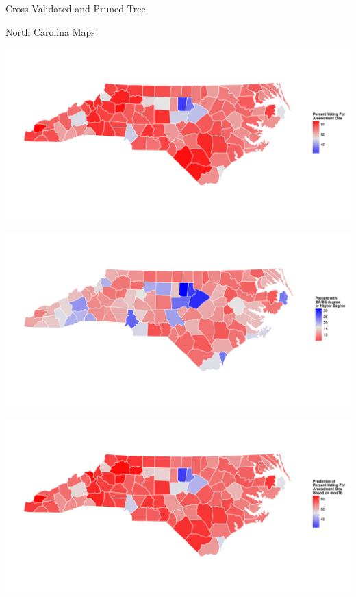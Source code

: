 \documentclass[final]{beamer}\usepackage[]{graphicx}\usepackage[]{color}
\makeatletter
\def\maxwidth{ %
  \ifdim\Gin@nat@width>\linewidth
    \linewidth
  \else
    \Gin@nat@width
  \fi
}
\newenvironment{knitrout}{}{} %
\makeatother
\begin{document}
\begin{frame}[fragile]
\begin{columns}[t]
\begin{column}{0.31\linewidth}
\begin{minipage}[t][.955\textheight]{\linewidth}
\begin{block}{Cross Validated and Pruned Tree}
\begin{knitrout}
{}



\end{knitrout}
\vspace{-3ex}
\end{block}
\vfill

\begin{block}{North Carolina Maps}
\vspace{-2ex}
\begin{knitrout}
\color{fgcolor}

{\centering \includegraphics[width=\maxwidth]{figure/NCmap-1} 

}




{\centering \includegraphics[width=\maxwidth]{figure/NCmap-2} 

}




{\centering \includegraphics[width=\maxwidth]{figure/NCmap-3} 

}
\end{knitrout}
\end{block}
\end{minipage}
\end{column}
\end{columns}
\end{frame}
\end{document}
